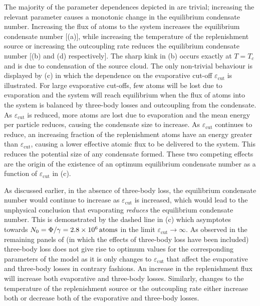 The majority of the parameter dependences depicted in  are trivial; increasing the relevant parameter causes a monotonic change in the equilibrium condensate number.  Increasing the flux of atoms to the system increases the equilibrium condensate number [(a)], while increasing the temperature of the replenishment source or increasing the outcoupling rate reduces the equilibrium condensate number [(b) and (d) respectively].  The sharp kink in (b) occurs exactly at $T=T_c$ and is due to condensation of the source cloud.  The only non-trivial behaviour is displayed by (c) in which the dependence on the evaporative cut-off $\varepsilon_\text{cut}$ is illustrated.  For large evaporative cut-offs, few atoms will be lost due to evaporation and the system will reach equilibrium when the flux of atoms into the system is balanced by three-body losses and outcoupling from the condensate.  As $\varepsilon_\text{cut}$ is reduced, more atoms are lost due to evaporation and the mean energy per particle reduces, causing the condensate size to increase.  As $\varepsilon_\text{cut}$ continues to reduce, an increasing fraction of the replenishment atoms have an energy greater than $\varepsilon_\text{cut}$, causing a lower effective atomic flux to be delivered to the system. This reduces the potential size of any condensate formed.  These two competing effects are the origin of the existence of an optimum equilibrium condensate number as a function of $\varepsilon_\text{cut}$ in (c).

As discussed earlier, in the absence of three-body loss, the equilibrium condensate number would continue to increase as $\varepsilon_\text{cut}$ is increased, which would lead to the unphysical conclusion that evaporating \emph{reduces} the equilibrium condensate number.  This is demonstrated by the dashed line in (c) which asymptotes towards $N_0=\Phi/\gamma = \unit[2.8\times 10^6]{atoms}$ in the limit $\varepsilon_\text{cut}\rightarrow \infty$.  As observed in the remaining panels of  (in which the effects of three-body loss have been included) three-body loss does not give rise to optimum values for the corresponding parameters of the model as it is only changes to $\varepsilon_\text{cut}$ that affect the evaporative and three-body losses in contrary fashions.  An increase in the replenishment flux will increase both evaporative and three-body losses.  Similarly, changes to the temperature of the replenishment source or the outcoupling rate either increase both or decrease both of the evaporative and three-body losses.

